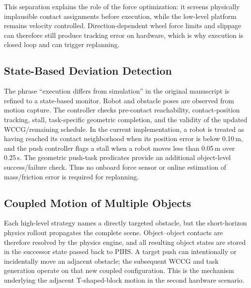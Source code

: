 \documentclass[journal,letterpaper]{IEEEtran}
\newcommand{\change}[1]{{\color{blue}#1}}
\begin{document}
\change{This separation explains the role of the force optimization: it screens physically implausible contact assignments before execution, while the low-level platform remains velocity controlled. Direction-dependent wheel force limits and slippage can therefore still produce tracking error on hardware, which is why execution is closed loop and can trigger replanning.}

\subsection{State-Based Deviation Detection}
\change{The phrase ``execution differs from simulation'' in the original manuscript is refined to a state-based monitor. Robot and obstacle poses are observed from motion capture. The controller checks pre-contact reachability, contact-position tracking, stall, task-specific geometric completion, and the validity of the updated WCCG/remaining schedule. In the current implementation, a robot is treated as having reached its contact neighborhood when its position error is below 0.10\,m, and the push controller flags a stall when a robot moves less than 0.05\,m over 0.25\,s. The geometric push-task predicates provide an additional object-level success/failure check. Thus no onboard force sensor or online estimation of mass/friction error is required for replanning.}

\subsection{Coupled Motion of Multiple Objects}
\change{Each high-level strategy names a directly targeted obstacle, but the short-horizon physics rollout propagates the complete scene. Object--object contacts are therefore resolved by the physics engine, and all resulting object states are stored in the successor state passed back to PIHS. A target push can intentionally or incidentally move an adjacent obstacle; the subsequent WCCG and task generation operate on that new coupled configuration. This is the mechanism underlying the adjacent T-shaped-block motion in the second hardware scenario.}
\end{document}
